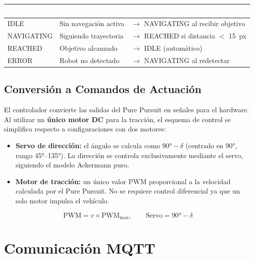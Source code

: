 \documentclass[11pt,a4paper]{article}
\begin{document}
\begin{table}[h!]
\centering
{}
\begin{tabularx}{\textwidth}{l X X}
    \toprule
    \rowcolor{azultabla}\textcolor{white}{\textbf{Estado}} & \textcolor{white}{\textbf{Descripción}} & \textcolor{white}{\textbf{Transición}} \\
    \midrule
    IDLE       & Sin navegación activa    & $\rightarrow$ NAVIGATING al recibir objetivo \\
    NAVIGATING & Siguiendo trayectoria    & $\rightarrow$ REACHED si distancia $<$ 15~px \\
    REACHED    & Objetivo alcanzado       & $\rightarrow$ IDLE (automático) \\
    ERROR      & Robot no detectado       & $\rightarrow$ NAVIGATING al redetectar \\
    \bottomrule
\end{tabularx}
\end{table}

\subsection{Conversión a Comandos de Actuación}

El controlador convierte las salidas del Pure Pursuit en señales para el hardware. Al utilizar un \textbf{único motor DC} para la tracción, el esquema de control se simplifica respecto a configuraciones con dos motores:

\begin{itemize}[nosep]
    \item \textbf{Servo de dirección:} el ángulo se calcula como $90° - \delta$ (centrado en 90°, rango 45°--135°). La dirección se controla exclusivamente mediante el servo, siguiendo el modelo Ackermann puro.
    \item \textbf{Motor de tracción:} un único valor PWM proporcional a la velocidad calculada por el Pure Pursuit. No se requiere control diferencial ya que un solo motor impulsa el vehículo.
\end{itemize}

\[
\text{PWM} = v \times \text{PWM}_{\text{max}}, \qquad \text{Servo} = 90° - \delta
\]

\section{Comunicación MQTT}
\end{document}
